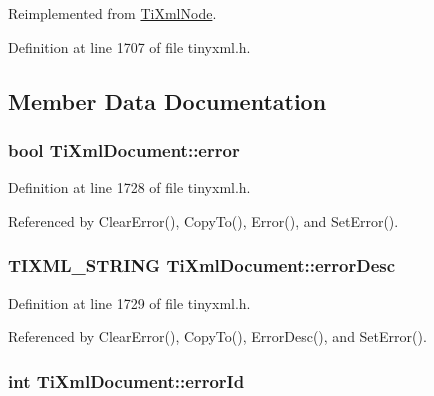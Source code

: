 Reimplemented from \hyperlink{class_ti_xml_node_a8a4cda4b15c29f64cff419309aebed08}{TiXmlNode}.

Definition at line 1707 of file tinyxml.h.

\subsection{Member Data Documentation}
\hypertarget{class_ti_xml_document_a1ff6a063602f31acae6f37fc049d8bbd}{
\subsubsection[{error}]{\setlength{\rightskip}{0pt plus 5cm}bool {\bf TiXmlDocument::error}}}
\label{class_ti_xml_document_a1ff6a063602f31acae6f37fc049d8bbd}


Definition at line 1728 of file tinyxml.h.

Referenced by ClearError(), CopyTo(), Error(), and SetError().\hypertarget{class_ti_xml_document_a2da9a95ba3f9c895a8d7f4de7122a642}{
\subsubsection[{errorDesc}]{\setlength{\rightskip}{0pt plus 5cm}TIXML\_\-STRING {\bf TiXmlDocument::errorDesc}}}
\label{class_ti_xml_document_a2da9a95ba3f9c895a8d7f4de7122a642}


Definition at line 1729 of file tinyxml.h.

Referenced by ClearError(), CopyTo(), ErrorDesc(), and SetError().\hypertarget{class_ti_xml_document_acdef97a4bb80729ac6863dd54cee7eeb}{
\subsubsection[{errorId}]{\setlength{\rightskip}{0pt plus 5cm}int {\bf TiXmlDocument::errorId}}}
\label{class_ti_xml_document_acdef97a4bb80729ac6863dd54cee7eeb}


